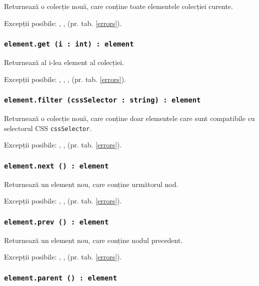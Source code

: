 Returnează o colecție nouă, care conține toate elementele colecției curente.

Excepții posibile: , ,  (pr. tab. \ref{errors}).

\subsubsection{\texttt{element.get (i : int) : element}}

Returnează al i-lea element al colecției.

Excepții posibile: , , ,  (pr. tab. \ref{errors}).

\subsubsection{\texttt{element.filter (cssSelector : string) : element}}

Returnează o colecție nouă, care conține doar elementele care sunt compatibile cu selectorul CSS \texttt{cssSelector}.

Excepții posibile: , ,  (pr. tab. \ref{errors}).
\subsubsection{\texttt{element.next () : element}}

Returnează un element nou, care conține următorul nod.

Excepții posibile: , ,  (pr. tab. \ref{errors}).

\subsubsection{\texttt{element.prev () : element}}

Returnează un element nou, care conține nodul precedent.

Excepții posibile: , ,  (pr. tab. \ref{errors}).

\subsubsection{\texttt{element.parent () : element}}

